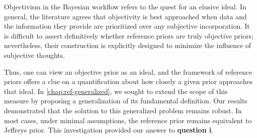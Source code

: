 










Objectivism in the Bayesian workflow refers to the quest for an elusive ideal. %
In general, the literature agrees that objectivity is best approached when data and the information they provide are prioritized over any subjective incorporation. It is difficult to assert definitively whether reference priors are truly objective priors; nevertheless, their construction is explicitly designed to minimize the influence of subjective thoughts.

Thus, one can view an objective prior as an ideal, and the framework of reference priors offers a clue on a quantification about how closely a given prior approaches that ideal. In \cref{chap:ref-generalized}, we sought to extend the scope of this measure by proposing a generalization of its fundamental definition. %
Our results demonstrated that the solution to this generalized problem remains robust. In most cases, under minimal assumptions, the reference prior remains equivalent to Jeffreys prior. This investigation provided our answer to \textbf{question i}.

